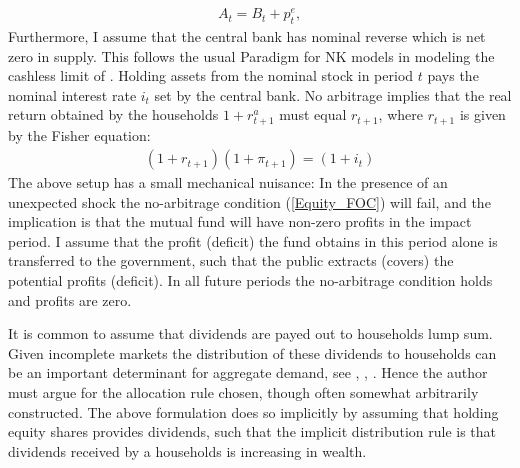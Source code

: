 \begin{gather*}
A_{t}=B_{t}+p_{t}^{e},
\end{gather*}
Furthermore, I assume that the central bank has nominal reverse which is net zero in supply. This follows the usual Paradigm for NK models in modeling the cashless limit of \citet{woodford1998doing}. Holding assets from the nominal stock in period $t$ pays the nominal interest rate $i_t$ set by the central bank. No arbitrage implies that the real return obtained by the households $1+r_{t+1}^{a}$ must equal $r_{t+1}$, where $r_{t+1}$ is given by the Fisher equation:
\begin{gather*}
\left(1+r_{t+1}\right)\left(1+\pi_{t+1}\right)=\left(1+i_{t}\right)
\end{gather*}
The above setup has a small mechanical nuisance: In the presence of an unexpected shock the no-arbitrage condition (\ref{Equity_FOC}) will fail, and the implication is that the mutual fund will have non-zero profits in the impact period. I assume that the profit (deficit) the fund obtains in this period alone is transferred to the government, such that the public extracts (covers) the potential profits (deficit). In all future periods the no-arbitrage condition holds and profits are zero.    

It is common to assume that dividends are payed out to households lump sum. Given incomplete markets the distribution of these dividends to households can be an important determinant for aggregate demand, see \citet{bilbiie2008limited}, \citet{broer2020new}, \citet{werning2015incomplete}. Hence the author must argue for the allocation rule chosen, though often somewhat arbitrarily constructed. The above formulation does so implicitly by assuming that holding equity shares provides dividends, such that the implicit distribution rule is that dividends received by a households is increasing in wealth. 



